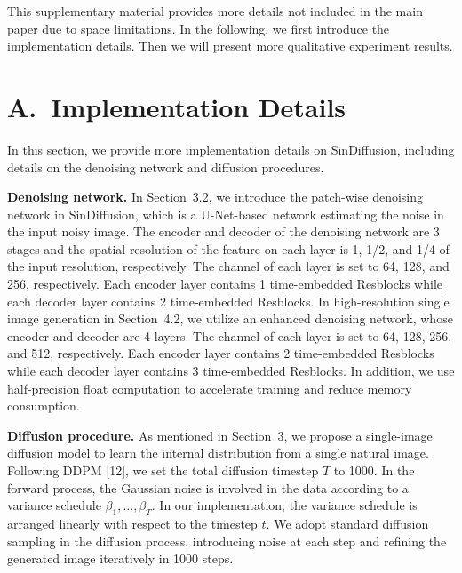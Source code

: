 \documentclass[10pt,twocolumn,letterpaper]{article}
\begin{document}
This supplementary material provides more details not included in the main paper due to space limitations.
In the following, we first introduce the implementation details.
Then we will present more qualitative experiment results. 

\section*{A.~Implementation Details}
In this section, we provide more implementation details on SinDiffusion, including details on the denoising network and diffusion procedures.

\vspace{2mm}
\noindent \textbf{Denoising network.}
In Section~3.2, we introduce the patch-wise denoising network in SinDiffusion, which is a U-Net-based network estimating the noise in the input noisy image.
The encoder and decoder of the denoising network are 3 stages and the spatial resolution of the feature on each layer is 1, 1/2, and 1/4 of the input resolution, respectively.
The channel of each layer is set to 64, 128, and 256, respectively.
Each encoder layer contains 1 time-embedded Resblocks while each decoder layer contains 2 time-embedded Resblocks.
In high-resolution single image generation in Section~4.2, we utilize an enhanced denoising network, whose encoder and decoder are 4 layers.
The channel of each layer is set to 64, 128, 256, and 512, respectively.
Each encoder layer contains 2 time-embedded Resblocks while each decoder layer contains 3 time-embedded Resblocks.
In addition, we use half-precision float computation to accelerate training and reduce memory consumption.

\vspace{2mm}
\noindent \textbf{Diffusion procedure.}
As mentioned in Section~3, we propose a single-image diffusion model to learn the internal distribution from a single natural image.
Following DDPM [12], we set the total diffusion timestep $T$ to 1000.
In the forward process, the Gaussian noise is involved in the data according to a variance schedule $\beta_1, \dots, \beta_T$.
In our implementation, the variance schedule is arranged linearly with respect to the timestep $t$.
We adopt standard diffusion sampling in the diffusion process, introducing noise at each step and refining the generated image iteratively in 1000 steps.
\end{document}
